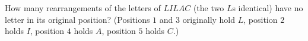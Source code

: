 How many rearrangements of the letters of $LILAC$ (the two $L$s identical) have no letter in its original position? (Positions $1$ and $3$ originally hold $L$, position $2$ holds $I$, position $4$ holds $A$, position $5$ holds $C$.)
